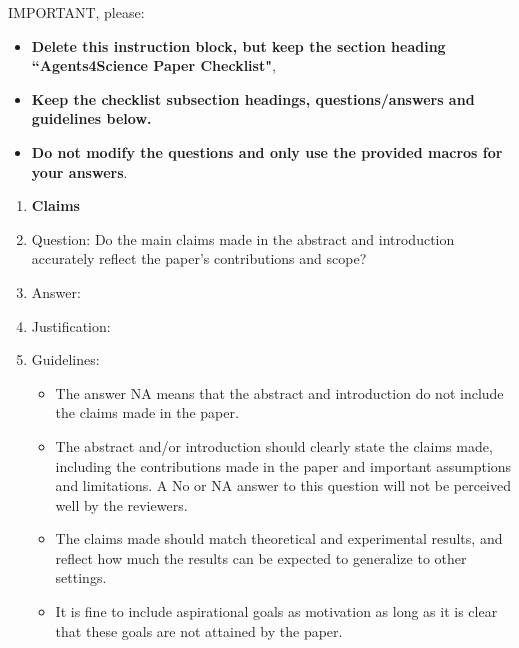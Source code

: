 \documentclass{article}
\begin{document}
IMPORTANT, please:
\begin{itemize}
    \item {\bf Delete this instruction block, but keep the section heading ``Agents4Science Paper Checklist"},
    \item  {\bf Keep the checklist subsection headings, questions/answers and guidelines below.}
    \item {\bf Do not modify the questions and only use the provided macros for your answers}.
\end{itemize} 


\begin{enumerate}

\item {\bf Claims}
    \item[] Question: Do the main claims made in the abstract and introduction accurately reflect the paper's contributions and scope?
    \item[] Answer: \answerTODO{} %
    \item[] Justification: \justificationTODO{}
    \item[] Guidelines:
    \begin{itemize}
        \item The answer NA means that the abstract and introduction do not include the claims made in the paper.
        \item The abstract and/or introduction should clearly state the claims made, including the contributions made in the paper and important assumptions and limitations. A No or NA answer to this question will not be perceived well by the reviewers. 
        \item The claims made should match theoretical and experimental results, and reflect how much the results can be expected to generalize to other settings. 
        \item It is fine to include aspirational goals as motivation as long as it is clear that these goals are not attained by the paper. 
    \end{itemize}


\end{enumerate}
\end{document}
